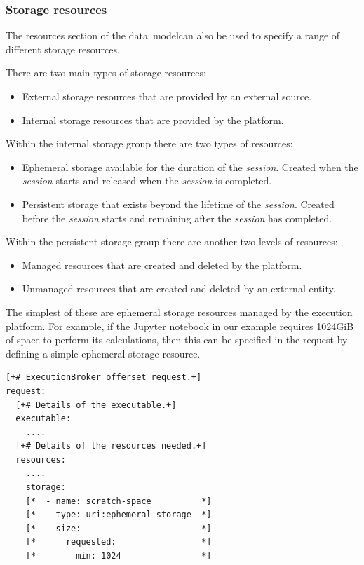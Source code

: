 \documentclass[11pt,a4paper]{ivoa}
\newcommand{\datamodel} {data~model}
\newcommand{\workerjob}[1] {\textit{session#1}}
\newcommand{\jupyternotebook} {Jupyter notebook}
\begin{document}
\subsubsection{Storage resources}
\label{subsub-storage-resources}

The resources section of the \datamodel{}can also be used to specify a range
of different storage resources.

There are two main types of storage resources:
\begin{itemize}
    \item External storage resources that are provided by an external source.
    \item Internal storage resources that are provided by the platform.
\end{itemize}

Within the internal storage group there are two types of resources:
\begin{itemize}
    \item Ephemeral storage available for the duration of the \workerjob{}.
    Created when the \workerjob{} starts and released when the \workerjob{} is completed.
    \item Persistent storage that exists beyond the lifetime of the \workerjob{}.
    Created before the \workerjob{} starts and remaining after the \workerjob{} has completed.
\end{itemize}

Within the persistent storage group there are another two levels of resources:
\begin{itemize}
    \item Managed resources that are created and deleted by the platform.
    \item Unmanaged resources that are created and deleted by an external entity.
\end{itemize}

The simplest of these are ephemeral storage resources managed by the execution platform.
For example, if the \jupyternotebook{} in our example requires 1024GiB of space to
perform its calculations, then this can be specified in the request by defining a
simple ephemeral storage resource.

\begin{lstlisting}[]
[+# ExecutionBroker offerset request.+]
request:
  [+# Details of the executable.+]
  executable:
    ....
  [+# Details of the resources needed.+]
  resources:
    ....
    storage:
    [*  - name: scratch-space          *]
    [*    type: uri:ephemeral-storage  *]
    [*    size:                        *]
    [*      requested:                 *]
    [*        min: 1024                *]
\end{lstlisting}
\end{document}
